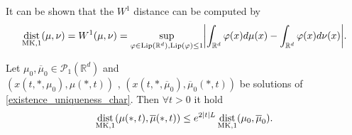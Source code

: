 \begin{remark}
 It can be shown that the $W^{1} $  distance can be computed by
 \begin{align*}
   \dist_{\text{MK},1}(\mu ,\nu ) = W^{1}(\mu ,\nu )  = \sup_{\phi \in \text{Lip}(\mathbb{R}^{d} ),\text{Lip}(\phi )\le 1} \abs*{\int_{\mathbb{R}^{d} } \phi(x) d\mu (x) - \int_{\mathbb{R}^{d} }\phi(x) d\nu(x)}
 .\end{align*}
\end{remark}
\begin{theorem}
  Let $\mu_0,\overline{\mu }_0 \in  \mathcal{P}_1(\mathbb{R}^{d} ) $  and\\
  $(x(t,*,\mu_0),\mu(*,t))$ , $(x(t,*,\overline{\mu}_0),\overline{\mu}_0 (*,t))$ be solutions of 
  \autoref{existence_uniqueness_char}. Then $\forall t >0$ it hold 
  \begin{align*}
    \operatorname*{dist}_{\text{MK},1}(\mu(*,t),\overline{\mu }(*,t) ) \le e^{2 \lvert t\rvert L} \operatorname*{dist}_{\text{MK},1} (\mu_0,\overline{\mu }_0 )
  .\end{align*}
\end{theorem}
